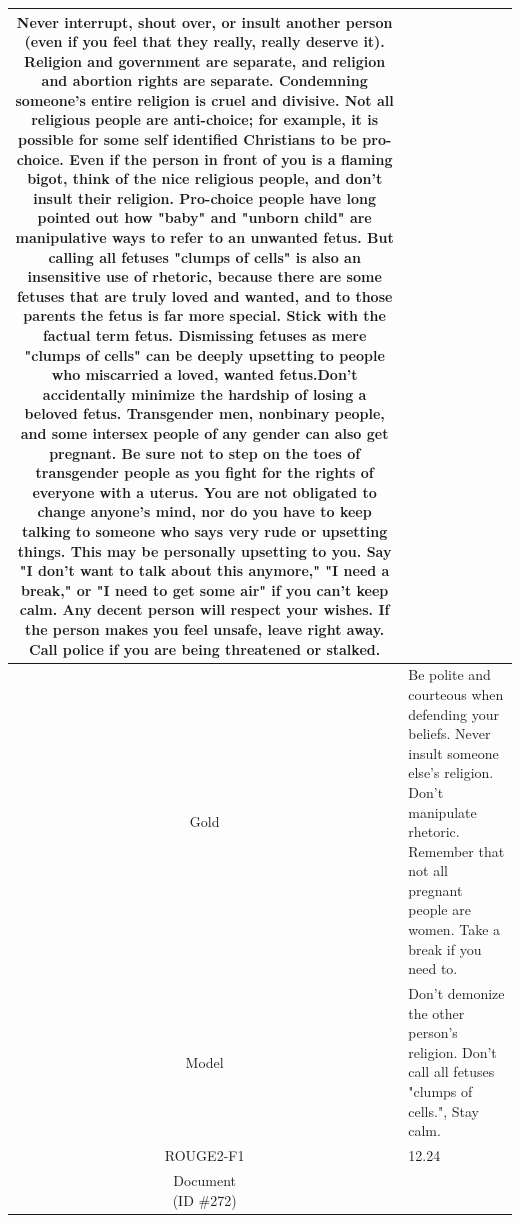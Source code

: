 \begin{table}[bth!]
\begin{tabular}{c|p{}}
Never interrupt, shout over, or insult another person (even if you feel that they really, really deserve it). Religion and government are separate, and religion and abortion rights are separate. Condemning someone's entire religion is cruel and divisive. Not all religious people are anti-choice; for example, it is possible for some self identified Christians to be pro-choice. Even if the person in front of you is a flaming bigot, think of the nice religious people, and don't insult their religion. Pro-choice people have long pointed out how "baby" and "unborn child" are manipulative ways to refer to an unwanted fetus. But calling all fetuses "clumps of cells" is also an insensitive use of rhetoric, because there are some fetuses that are truly loved and wanted, and to those parents the fetus is far more special. Stick with the factual term fetus. Dismissing fetuses as mere "clumps of cells" can be deeply upsetting to people who miscarried a loved, wanted fetus.Don't accidentally minimize the hardship of losing a beloved fetus. Transgender men, nonbinary people, and some intersex people of any gender can also get pregnant. Be sure not to step on the toes of transgender people as you fight for the rights of everyone with a uterus. You are not obligated to change anyone's mind, nor do you have to keep talking to someone who says very rude or upsetting things. This may be personally upsetting to you. Say "I don't want to talk about this anymore," "I need a break," or "I need to get some air" if you can't keep calm. Any decent person will respect your wishes. If the person makes you feel unsafe, leave right away. Call police if you are being threatened or stalked.
\\ \hline
Gold & 
Be polite and courteous when defending your beliefs. Never insult someone else's religion. Don't manipulate rhetoric. Remember that not all pregnant people are women. Take a break if you need to.
\\ \hline
Model & 
Don't demonize the other person's religion. Don't call all fetuses "clumps of cells.", Stay calm.
\\ \hline
ROUGE2-F1 & 
12.24
\\ \hline
\makecell{Document\\(ID \#272)} & 

\end{tabular}
\end{table}
